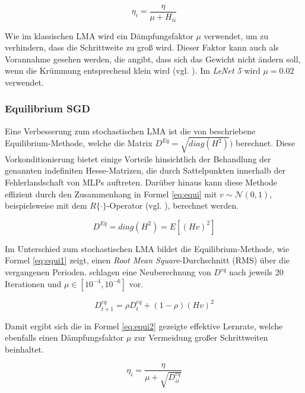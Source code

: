 \begin{equation}
\label{eq:lma} 
\eta_{i} = \frac{\eta}{\mu + H_{ii}}
\end{equation}

Wie im klassischen LMA wird ein Dämpfungsfaktor $\mu$ verwendet, um zu verhindern, dass die Schrittweite zu groß wird. Dieser Faktor kann auch als Vorannahme gesehen werden, die angibt, dass sich das Gewicht nicht ändern soll, wenn die Krümmung entsprechend klein wird (vgl. \cite{Martens2010}). Im \textit{LeNet 5} wird $\mu = 0.02$ verwendet.


\subsubsection{Equilibrium SGD}
Eine Verbesserung zum stochastischen LMA ist die von \cite{Dauphin2015} beschriebene Equilibrium-Methode, welche die Matrix $D^{Eq} = \sqrt{diag(H^2)})$ berechnet. Diese Vorkonditionierung bietet einige Vorteile hinsichtlich der Behandlung der genannten indefiniten Hesse-Matrizen, die durch Sattelpunkten innerhalb der Fehlerlandschaft von MLPs auftreten. Darüber hinaus kann diese Methode effizient durch den Zusammenhang in Formel \ref{eq:equi} mit $v \sim \mathcal{N} (0,1)$, beispielsweise mit dem $R\{\cdot\}$-Operator (vgl. \cite{Pearlmutter1994}), berechnet werden. 

\begin{equation}
\label{eq:equi} 
D^{Eq} = diag(H^2) = E[(Hv)^2]
\end{equation}

Im Unterschied zum stochastischen LMA bildet die Equilibrium-Methode, wie Formel \ref{eq:equi1} zeigt, einen  \textit{Root Mean Square}-Durchschnitt (RMS) über die vergangenen Perioden. \cite{Dauphin2015} schlagen eine Neuberechnung von $D^{eq}$ nach jeweils 20 Iterationen und $\mu \in [10^{-4},10^{-6}]$ vor.

\begin{equation}
\label{eq:equi1} 
D^{eq}_{t+1} = \rho D^{eq}_{t} + (1 - \rho) (Hv)^2
\end{equation}

Damit ergibt sich die in Formel \ref{eq:equi2} gezeigte effektive Lernrate, welche ebenfalls einen Dämpfungsfaktor $\mu$ zur Vermeidung großer Schrittweiten beinhaltet.

\begin{equation}
\label{eq:equi2} 
\eta_{i} = \frac{\eta}{\mu + \sqrt{D^{eq}_{ii}}}
\end{equation}

